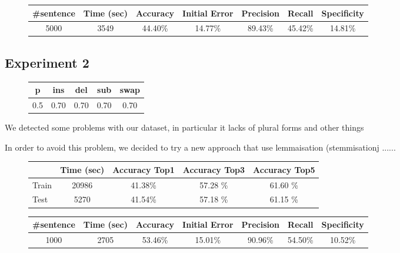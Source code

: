 \begin{figure}[H]
	\centering
	\begin{tabular}{ccccccc}
		\toprule
		\#sentence & Time (sec)  & Accuracy & Initial Error  &  Precision & Recall & Specificity \\
		\midrule
		\num{5000}	& \num{3549}  & \num{44,40}\%  & \num{14,77}\% & \num{89,43}\% & \num{45,42}\%  & 
		\num{14,81}\%  
		\\
		\bottomrule
	\end{tabular}
	\label{tab:sentence-eval1}
\end{figure}

\subsection{Experiment 2}
\begin{figure}[H]
	\centering
	\begin{tabular}{ccccc}
		\toprule
		p 				 & ins 				 	& del  				&  sub 			   &   swap\\ \midrule
		\num{0.5} & \num{0,70} & \num{0,70}  & \num{0,70} & \num{0,70}\\
		\bottomrule
	\end{tabular}
	\label{tab:error_model2}
\end{figure}

We detected some problems with our dataset, in particular it lacks of plural forms and other things

In order to avoid this problem, we decided to try a new approach that use lemmaisation (stemmisationj ......

\begin{figure}[H]
	\centering
	\begin{tabular}{lcccc}
		\toprule
		& Time (sec)  & Accuracy Top1 & Accuracy Top3  &  Accuracy Top5 \\
		\midrule
		Train & \num{20986} & \num{41,38}\%  & \num{57,28} \% & \num{61,60} \% \\
		Test &	\num{5270}  & \num{41,54}\%  & \num{57,18} \% & \num{61,15} \%  \\
		\bottomrule
	\end{tabular}
	\label{tab:typo-eval2}
\end{figure}


\begin{figure}[H]
	\centering
	\begin{tabular}{ccccccc}
		\toprule
		\#sentence & Time (sec)  & Accuracy & Initial Error  &  Precision & Recall & Specificity \\
		\midrule
		\num{1000}	& \num{2705}  & \num{53,46}\%  & \num{15,01}\% & \num{90,96}\% & \num{54,50}\%  & 
		\num{10,52}\%  
		\\
		\bottomrule
	\end{tabular}
	\label{tab:sentence-eval2}
\end{figure}

